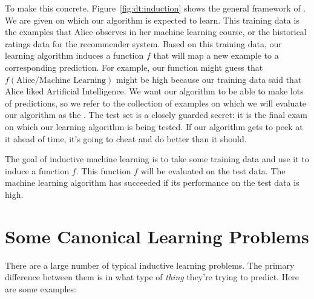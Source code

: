 

To make this concrete, Figure~\ref{fig:dt:induction} shows the general
framework of .  We are given  on which our algorithm is expected to learn.  This training
data is the examples that Alice observes in her machine learning
course, or the historical ratings data for the recommender system.
Based on this training data, our learning algorithm induces a function
$f$ that will map a new example to a corresponding prediction.  For
example, our function might guess that $f(\text{Alice/Machine
  Learning})$ might be high because our training data said that Alice
liked Artificial Intelligence.  We want our algorithm to be able to
make lots of predictions, so we refer to the collection of examples on
which we will evaluate our algorithm as the .  The
test set is a closely guarded secret: it is the final exam on which
our learning algorithm is being tested.  If our algorithm gets to peek
at it ahead of time, it's going to cheat and do better than it should.


The goal of inductive machine learning is to take some training data
and use it to induce a function $f$.  This function $f$ will be
evaluated on the test data.  The machine learning algorithm has
succeeded if its performance on the test data is high.

\section{Some Canonical Learning Problems}

There are a large number of typical inductive learning problems.  The
primary difference between them is in what type of \emph{thing}
they're trying to predict.  Here are some examples:

